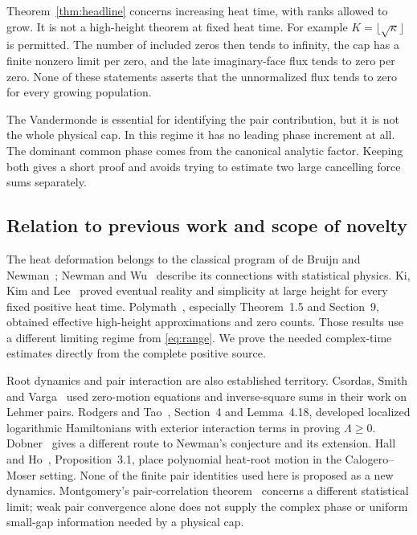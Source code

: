 \documentclass[11pt,letterpaper]{article}
\numberwithin{equation}{section}
\theoremstyle{remark}\newtheorem{remark}[theorem]{Remark}
\begin{document}
Theorem~\ref{thm:headline} concerns increasing heat time, with ranks
allowed to grow. It is not a high-height theorem at fixed heat time.
For example $K=\lfloor\sqrt\kappa\rfloor$ is permitted. The number of
included zeros then tends to infinity, the cap has a finite nonzero
limit per zero, and the late imaginary-face flux tends to zero per
zero. None of these statements asserts that the unnormalized flux
tends to zero for every growing population.

The Vandermonde is essential for identifying the pair contribution,
but it is not the whole physical cap. In this regime it has no leading
phase increment at all. The dominant common phase comes from the
canonical analytic factor. Keeping both gives a short proof and avoids
trying to estimate two large cancelling force sums separately.

\subsection{Relation to previous work and scope of novelty}

The heat deformation belongs to the classical program of de Bruijn
and Newman~\cite{deBruijn,Newman}; Newman and Wu~\cite{NewmanWu}
describe its connections with statistical physics. Ki, Kim and
Lee~\cite{KKL} proved eventual reality and simplicity at large height
for every fixed positive heat time. Polymath~\cite{Polymath},
especially Theorem~1.5 and Section~9, obtained effective high-height
approximations and zero counts. Those results use a different limiting
regime from \eqref{eq:range}. We prove the needed complex-time
estimates directly from the complete positive source.

Root dynamics and pair interaction are also established territory.
Csordas, Smith and Varga~\cite{CSV} used zero-motion equations and
inverse-square sums in their work on Lehmer pairs. Rodgers and
Tao~\cite{RT}, Section~4 and Lemma~4.18, developed localized
logarithmic Hamiltonians with exterior interaction terms in proving
$\Lambda\ge0$. Dobner~\cite{Dobner} gives a different route to
Newman's conjecture and its extension. Hall and Ho~\cite{HallHo},
Proposition~3.1, place polynomial heat-root motion in the
Calogero--Moser setting. None of the finite pair identities used here
is proposed as a new dynamics. Montgomery's pair-correlation
theorem~\cite{Montgomery} concerns a different statistical limit;
weak pair convergence alone does not supply the complex phase or
uniform small-gap information needed by a physical cap.
\end{document}
